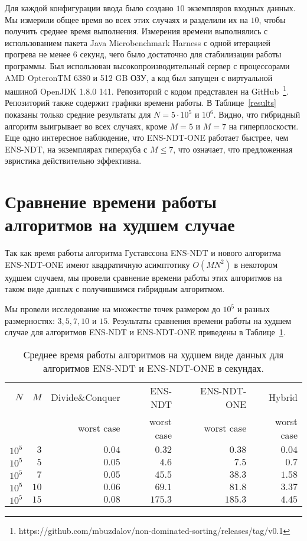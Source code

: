 Для каждой конфигурации ввода было создано $10$ экземпляров входных данных. Мы измерили общее время во всех этих случаях и разделили их на $10$, чтобы получить среднее время выполнения. Измерения времени выполнялись с использованием пакета Java Microbenchmark Harness с одной итерацией прогрева не менее 6 секунд, чего было достаточно для стабилизации работы программы. Был использован высокопроизводительный сервер с процессорами AMD OpteronTM 6380 и 512 GB ОЗУ, а код был запущен с виртуальной машиной OpenJDK 1.8.0 141.
Репозиторий с кодом представлен на GitHub~\footnote{https://github.com/mbuzdalov/non-dominated-sorting/releases/tag/v0.1}. Репозиторий также содержит графики времени работы. В Таблице~\ref{results} показаны только средние результаты для $N = 5 \cdot 10^5$ и $10^6$. Видно, что гибридный алгоритм выигрывает во всех случаях, кроме $M = 5$ и $M = 7$ на гиперплоскости. Еще одно интересное наблюдение, что ENS-NDT-ONE работает быстрее, чем ENS-NDT, на экземплярах гиперкуба с $M \leq 7$, что означает, что предложенная эвристика действительно эффективна.


\section{Сравнение времени работы алгоритмов на худшем случае}

Так как время работы алгоритма Густавссона ENS-NDT и нового алгоритма ENS-NDT-ONE имеют квадратичную асимптотику $O(MN^2)$ в некотором худшем случаем, мы провели сравнение времени работы этих алгоритмов на таком виде данных с получившимся гибридным алгоритмом. 

Мы провели исследование на множестве точек размером до $10^5$ и разных размерностях: $3, 5, 7, 10$ и $15$. Результаты сравнения времени работы на худшем случае для алгоритмов ENS-NDT и ENS-NDT-ONE приведены в Таблице~\ref{results_worst_case}.

\begin{table}[!ht]
\caption{Среднее время работы алгоритмов на худшем виде данных для алгоритмов ENS-NDT и ENS-NDT-ONE в секундах.}
\label{results_worst_case}
\begin{tabular}{rr|r|r|r|r}
$N$&$M$ & {Divide\&Conquer} 
        & {ENS-NDT} 
        & {ENS-NDT-ONE} 
        & {Hybrid} \\
& & {\scriptsize worst case} 
  & {\scriptsize worst case} 
  & {\scriptsize worst case} 
  & {\scriptsize worst case} \\\hline
      $10^5$&$3$  & $0.04$& $0.32$ & $0.38$ & $0.04$\\\hline
      $10^5$&$5$  & $0.05$& $4.6$ & $7.5$ & $0.7$\\\hline
      $10^5$&$7$  & $0.05$& $45.5$ & $38.3$ & $1.58$\\\hline
      $10^5$&$10$ & $0.06$& $69.1$ & $81.8$ & $3.37$\\\hline
      $10^5$&$15$ & $0.08$& $175.3$ & $185.3$ & $4.45$\\\hline
\end{tabular}
\end{table}

